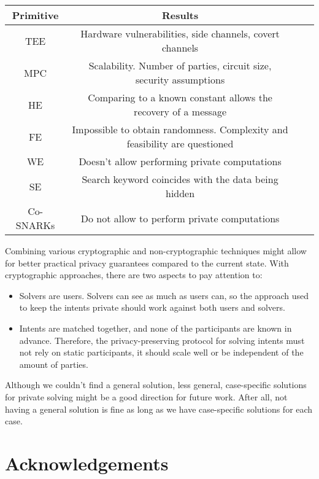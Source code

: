 \documentclass[final]{msc}
\begin{document}
\begin{center}
\begin{tabular}{ |c|c|c|c| } 
\hline
 Primitive & Results \\
\hline
\hline
TEE & Hardware vulnerabilities, side channels, covert channels \\ 
\hline
MPC & Scalability. Number of parties, circuit size, security assumptions \\ 
\hline
HE & Comparing to a known constant allows the recovery of a message\\ 
\hline
FE & Impossible to obtain randomness. Complexity and feasibility are questioned \\ 
\hline
WE & Doesn't allow performing private computations \\ 
\hline
SE & Search keyword coincides with the data being hidden\\ 
\hline
Co-SNARKs & Do not allow to perform private computations \\ 

\hline
\end{tabular}
\end{center}

Combining various cryptographic and non-cryptographic techniques might allow for better practical privacy guarantees compared to the current state. With cryptographic approaches, there are two aspects to pay attention to:
\begin{itemize}
    \item Solvers are users. Solvers can see as much as users can, so the approach used to keep the intents private should work against both users and solvers.
    \item Intents are matched together, and none of the participants are known in advance. Therefore, the privacy-preserving protocol for solving intents must not rely on static participants, it should scale well or be independent of the amount of parties.
\end{itemize}

Although we couldn't find a general solution, less general, case-specific solutions for private solving might be a good direction for future work. After all, not having a general solution is fine as long as we have case-specific solutions for each case.

\section*{Acknowledgements}


\nocite{*}

\end{document}
